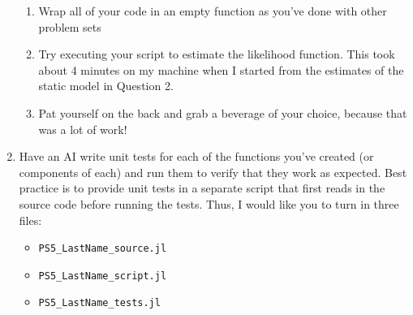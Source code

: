 \documentclass[12pt,english]{article}
\begin{document}
\begin{enumerate}
\begin{enumerate}
    \item Wrap all of your code in an empty function as you've done with other problem sets
    \item Try executing your script to estimate the likelihood function. This took about 4 minutes on my machine when I started from the estimates of the static model in Question 2.
    \item Pat yourself on the back and grab a beverage of your choice, because that was a lot of work!
    \end{enumerate}



\item Have an AI write unit tests for each of the functions you've created (or components of each) and run them to verify that they work as expected. Best practice is to provide unit tests in a separate script that first reads in the source code before running the tests. Thus, I would like you to turn in three files:
    \begin{itemize}
        \item \texttt{PS5\_LastName\_source.jl}
        \item \texttt{PS5\_LastName\_script.jl}
        \item \texttt{PS5\_LastName\_tests.jl}
    \end{itemize}


\end{enumerate}
\end{document}
